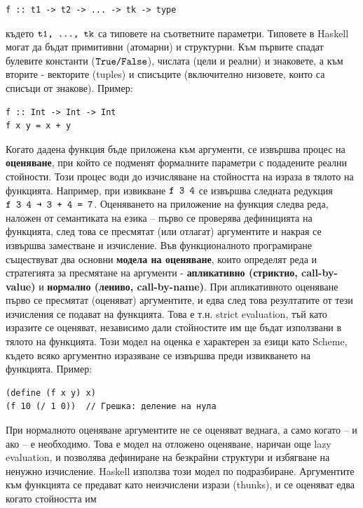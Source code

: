 \documentclass{article}
\newcommand{\cppplain}[1]{\textcolor{black}{\texttt{#1}}}
\begin{document}
\begin{lstlisting}[style=cpp]
f :: t1 -> t2 -> ... -> tk -> type
\end{lstlisting}
където $\cppplain{t1, ..., tk}$ са типовете на съответните параметри. Типовете в Haskell могат да бъдат примитивни (атомарни) и структурни. Към първите спадат булевите константи
($\cppplain{True/False}$), числата (цели и реални) и знаковете, а към вторите - векторите (tuples) и списъците (включително низовете, които са списъци от знакове). Пример:
\begin{lstlisting}[style=cpp]
f :: Int -> Int -> Int
f x y = x + y
\end{lstlisting}
Когато дадена функция бъде приложена към аргументи, се извършва процес на \textbf{оценяване}, при който се подменят формалните параметри с подадените реални стойности. Този процес води до
изчисляване на стойността на израза в тялото на функцията. Например, при извикване $\cppplain{f 3 4}$ се извършва следната редукция $\cppplain{f 3 4 → 3 + 4 = 7}$.
Оценяването на приложение на функция следва реда, наложен от семантиката на езика – първо се проверява дефиницията на функцията, след това се пресмятат (или отлагат) аргументите
и накрая се извършва заместване и изчисление. \newline\newline
Във функционалното програмиране съществуват два основни \textbf{модела на оценяване}, които определят реда и стратегията за пресмятане на аргументи - 
\textbf{апликативно (стриктно, call-by-value)} и \textbf{нормално (лениво, call-by-name)}. При апликативното оценяване първо се пресмятат (оценяват) аргументите, и едва след това резултатите от тези изчисления
се подават на функцията. Това е т.н. strict evaluation, тъй като изразите се оценяват, независимо дали стойностите им ще бъдат използвани в тялото на функцията. Този модел на оценка е характерен
за езици като Scheme, където всяко аргументно изразяване се извършва преди извикването на функцията. Пример:
\begin{lstlisting}[style=cpp]
(define (f x y) x)
(f 10 (/ 1 0))  // Грешка: деление на нула
\end{lstlisting}
При нормалното оценяване аргументите не се оценяват веднага, а само когато – и ако – е необходимо. Това е модел на отложено оценяване, наричан още lazy evaluation, и позволява дефиниране на безкрайни
структури и избягване на ненужно изчисление. Haskell използва този модел по подразбиране. Аргументите към функцията се предават като неизчислени изрази (thunks), и се оценяват едва когато стойността им
\end{document}
